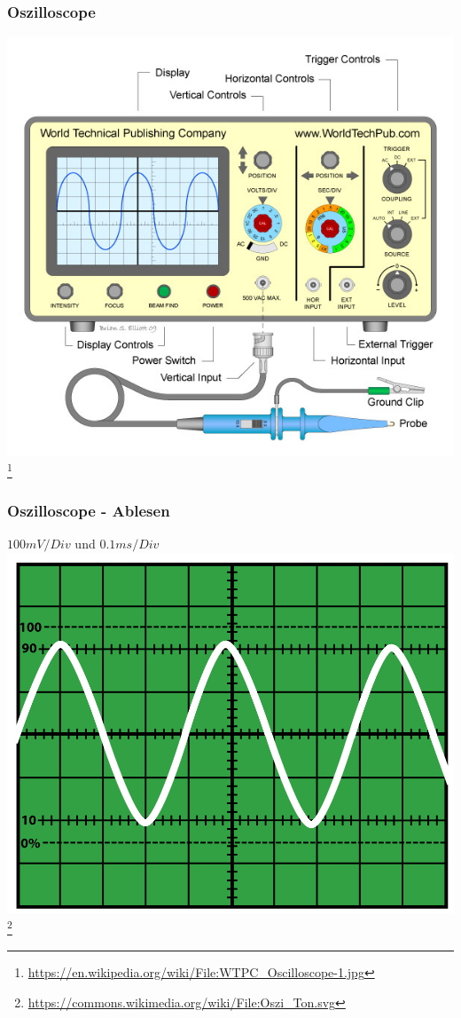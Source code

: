 \begin{frame}
    \frametitle{Oszilloscope}
    \begin{center}
        \includegraphics[width=.8\textwidth]{e17/WTPCOscilloscopeBeschreiben.jpg}
        \footnote{\tiny \url{https://en.wikipedia.org/wiki/File:WTPC_Oscilloscope-1.jpg}}
	\end{center}
\end{frame}

\begin{frame}
    \frametitle{Oszilloscope - Ablesen}
    \begin{center}
        $100mV / Div$ und $0.1ms / Div$
        \includegraphics[width=.8\textwidth]{e17/OsziTon.png}
        \footnote{\tiny \url{https://commons.wikimedia.org/wiki/File:Oszi_Ton.svg}}
	\end{center}
\end{frame}

